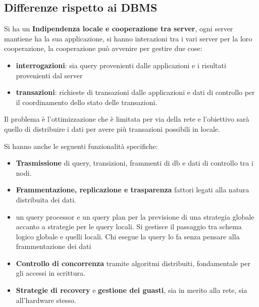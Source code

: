 \subsection{Differenze rispetto ai DBMS}
Si ha un \textbf{Indipendenza locale e cooperazione tra server}, ogni server
mantiene ha la sua applicazione, si hanno interazioni tra i vari server per la
loro cooperazione, la cooperazione può avvenire per gestire due cose:
\begin{itemize}
      \item \textbf{interrogazioni}: sia query provenienti dalle applicazioni e
            i risultati provenienti dal server
      \item \textbf{transazioni}: richieste di transazioni dalle applicazioni  e
            dati di controllo per il coordinamento dello stato delle transazioni.
\end{itemize}
Il problema è l'ottimizzazione che è limitata per via della rete e l'obiettivo
sarà quello di distribuire i dati per avere più transazioni possibili in locale.

Si hanno anche le seguenti funzionalità specifiche:
\begin{itemize}
      \item \textbf{Trasmissione} di query, transizioni, frammenti di db e dati
            di controllo tra i nodi.
      \item \textbf{Frammentazione, replicazione e trasparenza} fattori legati
            alla natura distribuita dei dati.
      \item un query processor e un query plan per la previsione di una
            strategia globale accanto a strategie per le query locali. Si gestisce
            il passaggio tra schema logico globale e quelli locali. Chi esegue
            la query lo fa senza pensare alla frammentazione dei dati
      \item \textbf{Controllo di concorrenza} tramite algoritmi distribuiti, fondamentale
            per gli accessi in scrittura.
      \item \textbf{Strategie di recovery} e \textbf{gestione dei guasti}, sia
            in merito alla rete, sia all'hardware stesso.
\end{itemize}

